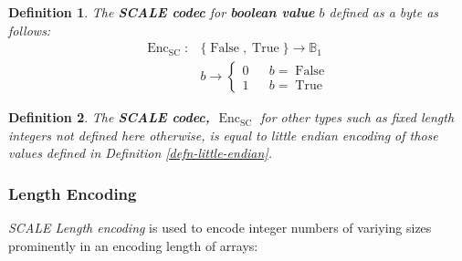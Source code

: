 \documentclass{article}
\newcommand{\tmem}[1]{{\em #1\/}}
\newcommand{\tmop}[1]{\ensuremath{\operatorname{#1}}}
\newcommand{\tmstrong}[1]{\textbf{#1}}
\newcommand{\tmtextbf}[1]{{\bfseries{#1}}}
\newcommand{\tmtextit}[1]{{\itshape{#1}}}
\newtheorem{definition}{Definition}
\providecommand{\tmem}[1]{\tmtextit{#1}}
\providecommand{\tmop}[1]{\ensuremath{\mathrm{#1}}}
\providecommand{\tmstrong}[1]{\tmtextbf{#1}}
\providecommand{\tmtextbf}[1]{\tmtextbf{#1}}
\providecommand{\tmtextit}[1]{\tmtextit{#1}}
\newtheorem{definition}{Definition}
\begin{document}
\begin{definition}
  The {\tmstrong{SCALE codec}} for {\tmstrong{boolean value}} $b$ defined as a
  byte as follows:
  \[ \begin{array}{ll}
       \tmop{Enc}_{\tmop{SC}} : & \{ \tmop{False}, \tmop{True} \} \rightarrow
       \mathbb{B}_1\\
       & b \rightarrow \left\{ \begin{array}{lcl}
         0 &  & b = \tmop{False}\\
         1 &  & b = \tmop{True}
       \end{array} \right.
     \end{array} \]
\end{definition}

\begin{definition}
  The {\tmstrong{SCALE codec, $\tmop{Enc}_{\tmop{SC}}$}} for other types such
  as fixed length integers not defined here otherwise, is equal to little
  endian encoding of those values defined in Definition
  \ref{defn-little-endian}. 
\end{definition}

\subsubsection{Length Encoding}\label{sect-int-encoding}

{\tmem{SCALE Length encoding}} is used to encode integer numbers of variying
sizes prominently in an encoding length of arrays:
\end{document}
